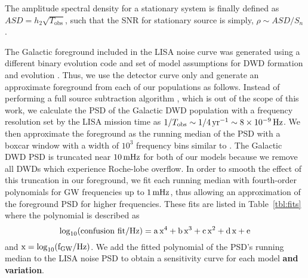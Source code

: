\documentclass[twocolumn, linenumbers]{aastex631}
\begin{document}
The amplitude spectral density for a stationary system is finally defined as $ASD = h_{2} \sqrt{T_\text{obs}}$, such that the SNR for stationary source is simply, $\rho \sim ASD/S_n$.

The Galactic foreground included in the \citet{Robson2019} LISA noise curve was generated using a different binary evolution code and set of model assumptions for DWD formation and evolution \citep{Toonen2012, Korol2017}. Thus, we use the detector curve only and generate an approximate foreground from each of our populations as follows. Instead of performing a full source subtraction algorithm \citep[e.g.][]{Littenberg2020}, which is out of the scope of this work, we calculate the PSD of the Galactic DWD population with a frequency resolution set by the LISA mission time as $1/T_{\rm{obs}}\sim1/4\,\rm{yr}^{-1}\sim8\times10^{-9}\,\rm{Hz}$. We then approximate the foreground as the running median of the PSD with a boxcar window with a width of $10^3$ frequency bins similar to \citet{Benacquista2006}. The Galactic DWD PSD is truncated near $10\,\rm{mHz}$ for both of our models because we remove all DWDs which experience Roche-lobe overflow. In order to smooth the effect of this truncation in our foreground, we fit each running median with fourth-order polynomials for GW frequencies up to $1\,\rm{mHz}$, thus allowing an approximation of the foreground PSD for higher frequencies. These fits are listed in Table~\ref{tbl:fits} where the polynomial is described as
\begin{equation}
\label{eq:fit}
    \log_{10}(\rm{confusion\ fit}/\rm{Hz}) = a\,x^4 + b\,x^3 + c\,x^2 + d\,x + e
\end{equation}
\noindent and $\rm{x}=\log_{10}(f_{\rm{GW}}/\rm{Hz})$. We add the fitted polynomial of the PSD's running median to the LISA noise PSD to obtain a sensitivity curve for each model \textbf{and variation}. 
\end{document}
